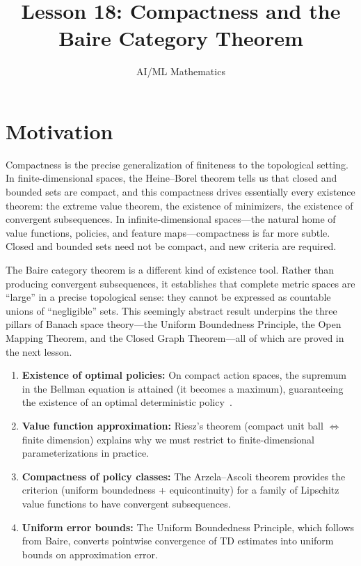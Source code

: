 \documentclass[11pt,a4paper]{article}
\title{Lesson 18: Compactness and the Baire Category Theorem}
\author{AI/ML Mathematics}
\date{}
\begin{document}
\maketitle
\tableofcontents
\newpage


\section{Motivation}
\label{sec:motivation}

Compactness is the precise generalization of finiteness to the topological
setting. In finite-dimensional spaces, the Heine--Borel theorem tells us
that closed and bounded sets are compact, and this compactness drives
essentially every existence theorem: the extreme value theorem, the existence
of minimizers, the existence of convergent subsequences. In
infinite-dimensional spaces---the natural home of value functions, policies,
and feature maps---compactness is far more subtle. Closed and bounded sets
need not be compact, and new criteria are required.

The Baire category theorem is a different kind of existence tool. Rather than
producing convergent subsequences, it establishes that complete metric spaces
are ``large'' in a precise topological sense: they cannot be expressed as
countable unions of ``negligible'' sets. This seemingly abstract result
underpins the three pillars of Banach space theory---the Uniform Boundedness
Principle, the Open Mapping Theorem, and the Closed Graph Theorem---all of
which are proved in the next lesson.

\begin{rlconnection}[title={Why Compactness and Baire Matter for RL}]
\begin{enumerate}[leftmargin=2em,nosep]
    \item \textbf{Existence of optimal policies:} On compact action spaces,
          the supremum in the Bellman equation is attained (it becomes a
          maximum), guaranteeing the existence of an optimal deterministic
          policy~\cite{puterman2014}.
    \item \textbf{Value function approximation:} Riesz's theorem (compact
          unit ball $\Leftrightarrow$ finite dimension) explains why we must
          restrict to finite-dimensional parameterizations in practice.
    \item \textbf{Compactness of policy classes:} The Arzela--Ascoli theorem
          provides the criterion (uniform boundedness + equicontinuity) for a
          family of Lipschitz value functions to have convergent subsequences.
    \item \textbf{Uniform error bounds:} The Uniform Boundedness Principle,
          which follows from Baire, converts pointwise convergence of TD
          estimates into uniform bounds on approximation error.
\end{enumerate}
\end{rlconnection}
\end{document}
